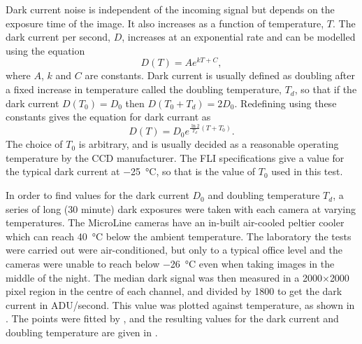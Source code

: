 \begin{colsection}
\begin{colsection}
Dark current noise is independent of the incoming signal but depends on the exposure time of the image. It also increases as a function of temperature, $T$. The dark current per second, $D$, increases at an exponential rate and can be modelled using the equation
%
\begin{equation}
    D(T) = Ae^{kT + C},
    \label{eq:dark_model}
\end{equation}
%
where $A$, $k$ and $C$ are constants. Dark current is usually defined as doubling after a fixed increase in temperature called the doubling temperature, $T_d$, so that if the dark current $D(T_0) = D_0$ then $D(T_0 + T_d) = 2D_0$. Redefining  using these constants gives the equation for dark currant as
%
\begin{equation}
    D(T) = D_0 e^{\frac{\ln2}{T_d}(T + T_0)}.
    \label{eq:dc}
\end{equation}
%
The choice of $T_0$ is arbitrary, and is usually decided as a reasonable operating temperature by the CCD manufacturer. The FLI specifications give a value for the typical dark current at \SI{-25}{\celsius}, so that is the value of $T_0$ used in this test.

In order to find values for the dark current $D_0$ and doubling temperature $T_d$, a series of long (30 minute) dark exposures were taken with each camera at varying temperatures. The MicroLine cameras have an in-built air-cooled peltier cooler which can reach \SI{40}{\celsius} below the ambient temperature. The laboratory the tests were carried out were air-conditioned, but only to a typical office level and the cameras were unable to reach below \SI{-26}{\celsius} even when taking images in the middle of the night. The median dark signal was then measured in a 2000$\times$2000 pixel region in the centre of each channel, and divided by 1800 to get the dark current in ADU/second. This value was plotted against temperature, as shown in . The points were fitted by , and the resulting values for the dark current and doubling temperature are given in .


\end{colsection}
\end{colsection}
